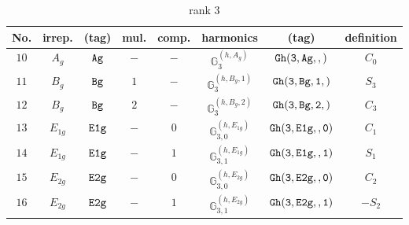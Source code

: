 \documentclass[fleqn,8pt]{jsarticle}
\begin{document}
\begin{table}[ht!]
\begin{center}
\caption{rank 3}
\renewcommand{\arraystretch}{1.3}
\begin{tabular}{cccccccc} \hline \hline
No. & irrep. & (tag) & mul. & comp. & harmonics & (tag) & definition \\ \hline
$ 10 $ & $ A_{g} $ & $ {\tt Ag} $ & $ - $ & $ - $ & $ \mathbb{G}_{3}^{(h,A_{g})} $ & $ {\tt Gh(3,Ag,,)} $ & $ C_{0} $ \\
$ 11 $ & $ B_{g} $ & $ {\tt Bg} $ & $ 1 $ & $ - $ & $ \mathbb{G}_{3}^{(h,B_{g},1)} $ & $ {\tt Gh(3,Bg,1,)} $ & $ S_{3} $ \\
$ 12 $ & $ B_{g} $ & $ {\tt Bg} $ & $ 2 $ & $ - $ & $ \mathbb{G}_{3}^{(h,B_{g},2)} $ & $ {\tt Gh(3,Bg,2,)} $ & $ C_{3} $ \\
$ 13 $ & $ E_{1g} $ & $ {\tt E1g} $ & $ - $ & $ 0 $ & $ \mathbb{G}_{3,0}^{(h,E_{1g})} $ & $ {\tt Gh(3,E1g,,0)} $ & $ C_{1} $ \\
$ 14 $ & $ E_{1g} $ & $ {\tt E1g} $ & $ - $ & $ 1 $ & $ \mathbb{G}_{3,1}^{(h,E_{1g})} $ & $ {\tt Gh(3,E1g,,1)} $ & $ S_{1} $ \\
$ 15 $ & $ E_{2g} $ & $ {\tt E2g} $ & $ - $ & $ 0 $ & $ \mathbb{G}_{3,0}^{(h,E_{2g})} $ & $ {\tt Gh(3,E2g,,0)} $ & $ C_{2} $ \\
$ 16 $ & $ E_{2g} $ & $ {\tt E2g} $ & $ - $ & $ 1 $ & $ \mathbb{G}_{3,1}^{(h,E_{2g})} $ & $ {\tt Gh(3,E2g,,1)} $ & $ - S_{2} $ \\
 \hline \hline
\end{tabular}
\end{center}
\end{table}
\end{document}
